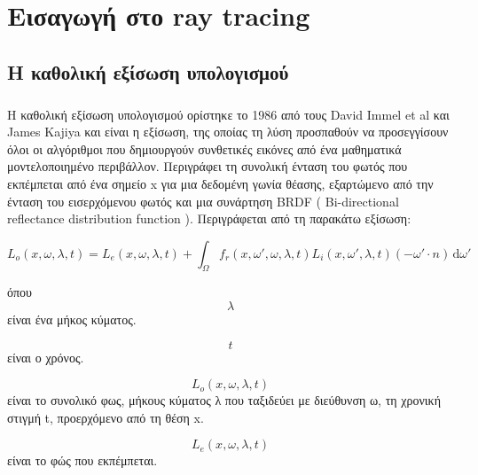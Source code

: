 \chapter{Εισαγωγή στο ray tracing}

\begin{sloppypar}

\section{H καθολική εξίσωση υπολογισμού}

\paragraph{}
	Η καθολική εξίσωση υπολογισμού ορίστηκε το 1986 από τους David Immel et al και James Kajiya και είναι η εξίσωση, της οποίας 
τη λύση προσπαθούν να προσεγγίσουν όλοι οι αλγόριθμοι που δημιουργούν συνθετικές εικόνες από ένα μαθηματικά μοντελοποιημένο 
περιβάλλον. Περιγράφει τη συνολική ένταση του φωτός που εκπέμπεται από ένα σημείο x για μια δεδομένη γωνία θέασης, εξαρτώμενο 
από την ένταση του εισερχόμενου φωτός και μια συνάρτηση BRDF ( Bi-directional reflectance distribution function ). Περιγράφεται 
από τη παρακάτω εξίσωση:

\begin{equation}
L_o (x, \omega, \lambda, t) = L_e (x, \omega , \lambda , t) + \int_\Omega f_r(x, \omega', \omega, \lambda, t) L_i(x, \omega', \lambda, t)(-\omega' \cdot n) \, \mathrm{d}\omega'
\end{equation}

όπου\\

\begin{equation}
	\lambda
\end{equation}
 είναι ένα μήκος κύματος.

\begin{equation}
	t
\end{equation}
είναι ο χρόνος.

\begin{equation}
	L_o (x, \omega, \lambda, t)
\end{equation}
είναι το συνολικό φως, μήκους κύματος λ που ταξιδεύει με διεύθυνση ω, τη χρονική στιγμή t, προερχόμενο από τη θέση x.

\begin{equation}
	L_e (x, \omega , \lambda , t)
\end{equation}
είναι το φώς που εκπέμπεται.


\end{sloppypar}
